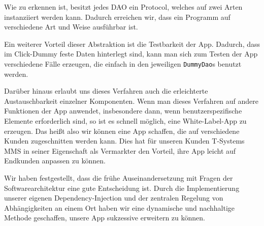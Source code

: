 	
	
\noindent	Wie zu erkennen ist, besitzt jedes \ac{DAO} ein Protocol, welches auf zwei Arten instanziiert werden kann. Dadurch erreichen wir, dass ein Programm auf verschiedene Art und Weise ausführbar ist.
	
	Ein weiterer Vorteil dieser Abstraktion ist die Testbarkeit der App. Dadurch, dass im Click-Dummy feste Daten hinterlegt sind, kann man sich zum Testen der App verschiedene Fälle erzeugen, die einfach in den jeweiligen \texttt{DummyDao}s benutzt werden.
	
	Darüber hinaus erlaubt uns dieses Verfahren auch die erleichterte Austauschbarkeit einzelner Komponenten. Wenn man dieses Verfahren auf andere Funktionen der App anwendet, insbesondere dann, wenn benutzerspezifische Elemente erforderlich sind, so ist es schnell möglich, eine White-Label-App zu erzeugen. Das heißt also wir können eine App schaffen, die auf verschiedene Kunden zugeschnitten werden kann. Dies hat für unseren Kunden T-Systems MMS in seiner Eigenschaft als Vermarkter den Vorteil, ihre App leicht auf Endkunden anpassen zu können.
	
	Wir haben festgestellt, dass die frühe Auseinandersetzung mit Fragen der Softwarearchitektur eine gute Entscheidung ist. Durch die Implementierung unserer eigenen Dependency-Injection und der zentralen Regelung von Abhängigkeiten an einem Ort haben wir eine dynamische und nachhaltige Methode geschaffen, unsere App sukzessive erweitern zu können.